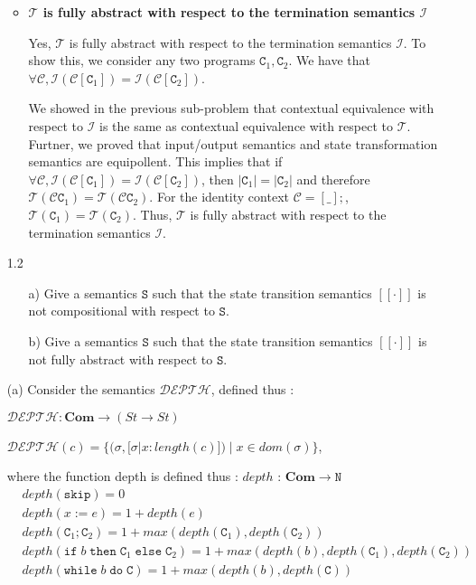 \documentclass{article}
\newcommand{\C}{\mathtt{C}}
\newcommand{\N}{\mathtt{N}}
\newcommand{\ifsym}{\mathtt{if}}
\newcommand{\then}{\mathtt{then}}
\newcommand{\elsesym}{\mathtt{else}}
\newcommand{\whilesym}{\mathtt{while}}
\newcommand{\dosym}{\mathtt{do}}
\newcommand{\skipsym}{\mathtt{skip}}
\newcommand{\Sem}{\mathtt{S}}
\newcommand{\question}[1]
{\color{DarkBlue}#1 \color{Black}}
\begin{document}
\begin{enumerate}
\begin{itemize}
\item \textbf{$\mathcal{T}$ is fully abstract with respect to the termination
semantics $\mathcal{I}$}

	Yes, $\mathcal{T}$ is fully abstract with respect to the termination
	semantics $\mathcal{I}$.
	To show this, we consider any two programs $\C_1,\C_2$.
	We have that $\forall \mathcal{C},	
	\mathcal{I}(\mathcal{C}[\C_1]) = \mathcal{I}(\mathcal{C}[\C_2])$.	
 	
	We showed in the previous sub-problem that contextual equivalence with respect
	to $\mathcal{I}$ is the same as contextual equivalence with respect to 
	$\mathcal{T}$. Furtner, we proved that input/output semantics and state
	transformation semantics are equipollent.
	This implies that if $\forall \mathcal{C},
    \mathcal{I}(\mathcal{C}[\C_1]) = \mathcal{I}(\mathcal{C}[\C_2])$, 
    then $| \C_1 | = | \C_2 |$ and therefore $\mathcal{T}(\mathcal{C}\C_1) =
    \mathcal{T}(\mathcal{C}\C_2)$. 
    For the identity context $\mathcal{C} = [ \_ ];$,
    $\mathcal{T}(\C_1) = \mathcal{T}(\C_2)$. 
    Thus,  $\mathcal{T}$ is fully abstract with respect to the termination
	semantics $\mathcal{I}$.
	
\end{itemize}

\question{	
\item[1.2]
\begin{enumerate}
	\item[a)] Give a semantics $\Sem$ such that the state transition semantics 
	$[[\cdot]]$ is not compositional with respect to $\Sem$.
	\item[b)] Give a semantics $\Sem$ such that the state transition semantics 
	$[[\cdot]]$ is not fully abstract with respect to $\Sem$.
\end{enumerate}
}

(a) Consider the semantics $\mathcal{DEPTH}$, defined thus :

	$\mathcal{DEPTH} : \textbf{Com} \rightarrow (St \rightarrow St)$
	
	$ \mathcal{DEPTH}(c) = \{ (\sigma, [ \sigma | x : length(c) ] ) 
	\; | \; x \in dom (\sigma) \}$,
	
	where the function depth is defined thus :
	$depth$ : $\textbf{Com} \rightarrow \N$ 	
	\begin{align*}
	& depth(\skipsym) = 0 \\
	& depth(x := e) = 1 + depth(e) \\
	& depth (\C_1 ; \C_2 ) = 1 + max (depth (\C_1 ), depth (\C_2 ))	\\
	& depth(\ifsym \; b \;  \then \;  \C_1 \;  \elsesym \;  \C_2 ) 
	= 1 + max(depth(b), depth(\C_1), depth(\C_2)) \\
	& depth (\whilesym \; b \;  \dosym \;  \C) = 1 + max (depth (b), depth (\C)) \\
	\end{align*}
	

\end{enumerate}
\end{document}
